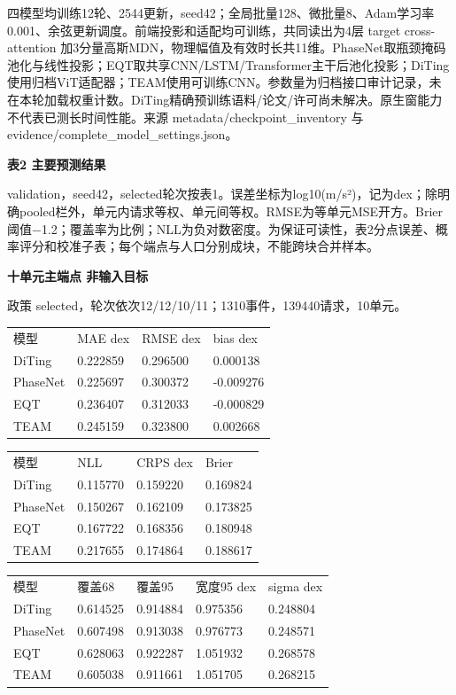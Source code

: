 \documentclass[UTF8,a4paper,11pt]{ctexart}
\begin{document}
四模型均训练12轮、2544更新，seed42；全局批量128、微批量8、Adam学习率0.001、余弦更新调度。前端投影和适配均可训练，共同读出为4层 target cross-attention 加3分量高斯MDN，物理幅值及有效时长共11维。PhaseNet取瓶颈掩码池化与线性投影；EQT取共享CNN/LSTM/Transformer主干后池化投影；DiTing使用归档ViT适配器；TEAM使用可训练CNN。参数量为归档接口审计记录，未在本轮加载权重计数。DiTing精确预训练语料/论文/许可尚未解决。原生窗能力不代表已测长时间性能。来源 metadata/checkpoint\_inventory 与 evidence/complete\_model\_settings.json。
\par\textbf{表2 主要预测结果}\par

validation，seed42，selected轮次按表1。误差坐标为log10(m/s²)，记为dex；除明确pooled栏外，单元内请求等权、单元间等权。RMSE为等单元MSE开方。Brier阈值−1.2；覆盖率为比例；NLL为负对数密度。为保证可读性，表2分点误差、概率评分和校准子表；每个端点与人口分别成块，不能跨块合并样本。

\par\textbf{十单元主端点 非输入目标}\par

政策 selected，轮次依次12/12/10/11；1310事件，139440请求，10单元。

\begin{longtable}{llll}
模型 & MAE dex & RMSE dex & bias dex \\
DiTing & 0.222859 & 0.296500 & 0.000138 \\
PhaseNet & 0.225697 & 0.300372 & -0.009276 \\
EQT & 0.236407 & 0.312033 & -0.000829 \\
TEAM & 0.245159 & 0.323800 & 0.002668 \\
\end{longtable}

\begin{longtable}{llll}
模型 & NLL & CRPS dex & Brier \\
DiTing & 0.115770 & 0.159220 & 0.169824 \\
PhaseNet & 0.150267 & 0.162109 & 0.173825 \\
EQT & 0.167722 & 0.168356 & 0.180948 \\
TEAM & 0.217655 & 0.174864 & 0.188617 \\
\end{longtable}

\begin{longtable}{lllll}
模型 & 覆盖68 & 覆盖95 & 宽度95 dex & sigma dex \\
DiTing & 0.614525 & 0.914884 & 0.975356 & 0.248804 \\
PhaseNet & 0.607498 & 0.913038 & 0.976773 & 0.248571 \\
EQT & 0.628063 & 0.922287 & 1.051932 & 0.268578 \\
TEAM & 0.605038 & 0.911661 & 1.051705 & 0.268215 \\
\end{longtable}
\end{document}
